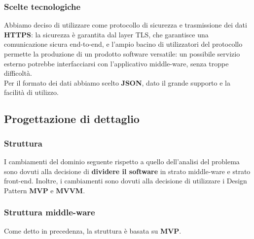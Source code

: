 \documentclass[a4paper]{article}
\begin{document}
\subsubsection{Scelte tecnologiche}
Abbiamo deciso di utilizzare come protocollo di sicurezza e trasmissione dei dati \textbf{HTTPS}: la sicurezza è garantita dal layer TLS, che garantisce una comunicazione sicura end-to-end, e l'ampio bacino di utilizzatori del protocollo permette la produzione di un prodotto software versatile: un possibile servizio esterno potrebbe interfacciarsi con l'applicativo middle-ware, senza troppe difficoltà.\\Per il formato dei dati abbiamo scelto \textbf{JSON}, dato il grande supporto e la facilità di utilizzo.

\newpage

\subsection{Progettazione di dettaglio}


\subsubsection{Struttura}

I cambiamenti del dominio seguente rispetto a quello dell’analisi del problema sono dovuti
alla decisione di \textbf{dividere il software} in strato middle-ware e strato front-end. Inoltre, i cambiamenti sono dovuti alla decisione di utilizzare i Design Pattern \textbf{MVP} e \textbf{MVVM}.

\subsubsection{Struttura middle-ware}


Come detto in precedenza, la struttura è basata su \textbf{MVP}.
\end{document}
